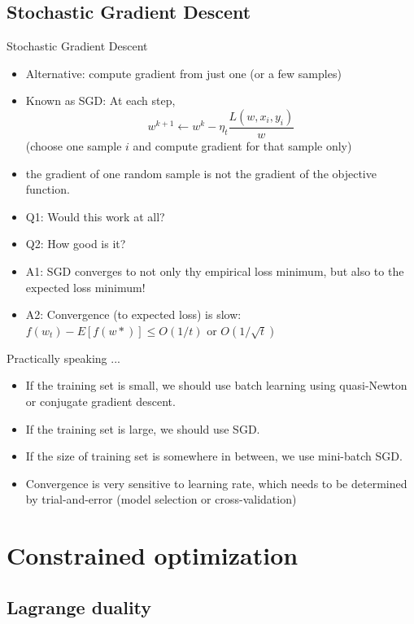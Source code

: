 \documentclass[notes]{beamer}
\begin{document}
\subsection{Stochastic Gradient Descent} 
\begin{frame}{Stochastic Gradient Descent} 
	\begin{itemize}
		\item Alternative: compute gradient from just one (or a few samples) 
		\item Known as SGD: At each step, 
		\[ w^{k+1} \leftarrow w^{k} - \eta_t \frac{L(w,x_i,y_i)}{w}  \] 
		(choose one sample $i$ and compute gradient for that sample only) 
		\item the gradient of one random sample is not the gradient of the objective function. 
		\item Q1: Would this work at all? 
		\item Q2: How good is it? 
		\item<2-> A1: SGD converges to not only thy empirical loss minimum, but also to the expected loss minimum! 
		\item<2-> A2: Convergence (to expected loss) is slow: $f(w_t) -E[f(w*)] \le O(1/t) $ or $O(1/\sqrt{t}) $
	\end{itemize}
\end{frame}

\begin{frame}{Practically speaking ... }
	\begin{itemize}
		\item If the training set is small, we should use batch learning using quasi-Newton or conjugate gradient descent. 
		\item If the training set is large, we should use SGD. 
		\item If the size of training set is somewhere in between, we use mini-batch SGD. 
		\item Convergence is very sensitive to learning rate, which needs to be determined by trial-and-error (model selection or cross-validation) 
	\end{itemize}
\end{frame}
\section{Constrained optimization} 
\subsection{Lagrange duality} 
\end{document}
